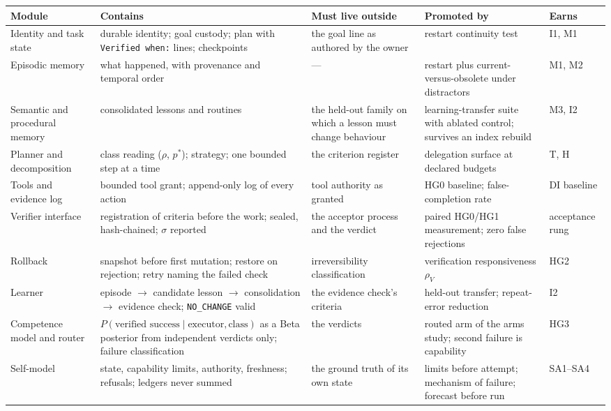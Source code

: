 \documentclass[11pt]{article}
\theoremstyle{definition}
\begin{document}
\begin{table}[!htbp]
\centering\scriptsize
\begin{tabularx}{\textwidth}{@{}lYYYl@{}}
\toprule
Module & Contains & Must live outside & Promoted by & Earns \\
\midrule
Identity and task state & durable identity; goal custody; plan with \texttt{Verified when:} lines; checkpoints & the goal line as authored by the owner & restart continuity test & I1, M1 \\
Episodic memory & what happened, with provenance and temporal order & --- & restart plus current-versus-obsolete under distractors & M1, M2 \\
Semantic and procedural memory & consolidated lessons and routines & the held-out family on which a lesson must change behaviour & learning-transfer suite with ablated control; survives an index rebuild & M3, I2 \\
Planner and decomposition & class reading ($\rho$, $p^{*}$); strategy; one bounded step at a time & the criterion register & delegation surface at declared budgets & T, H \\
Tools and evidence log & bounded tool grant; append-only log of every action & tool authority as granted & HG0 baseline; false-completion rate & DI baseline \\
Verifier interface & registration of criteria before the work; sealed, hash-chained; $\sigma$ reported & the acceptor process and the verdict & paired HG0/HG1 measurement; zero false rejections & acceptance rung \\
Rollback & snapshot before first mutation; restore on rejection; retry naming the failed check & irreversibility classification & verification responsiveness $\rho_V$ & HG2 \\
Learner & episode $\to$ candidate lesson $\to$ consolidation $\to$ evidence check; \texttt{NO\_CHANGE} valid & the evidence check's criteria & held-out transfer; repeat-error reduction & I2 \\
Competence model and router & $P(\text{verified success}\mid\text{executor},\text{class})$ as a Beta posterior from independent verdicts only; failure classification & the verdicts & routed arm of the arms study; second failure is capability & HG3 \\
Self-model & state, capability limits, authority, freshness; refusals; ledgers never summed & the ground truth of its own state & limits before attempt; mechanism of failure; forecast before run & SA1--SA4 \\

\end{tabularx}
\end{table}
\end{document}
